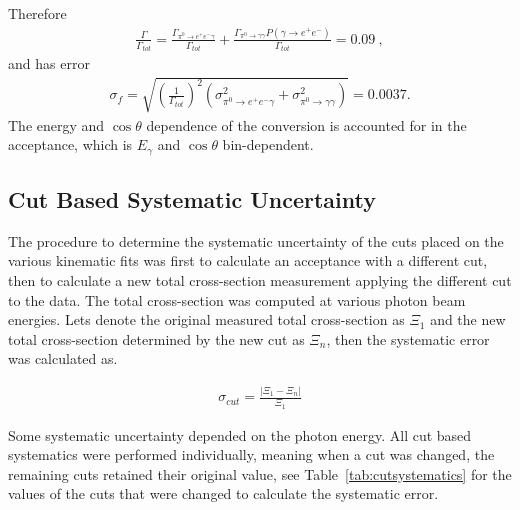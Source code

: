  	Therefore
 	\begin{align}
 		\frac{\Gamma}{\Gamma_{tot}} = \frac{\Gamma_{\pi^{0}\rightarrow e^{+}e^{-}\gamma}}{\Gamma_{tot}} + \frac{\Gamma_{\pi^{0}\rightarrow \gamma \gamma}P(\gamma \to  e^{+}e^{-})}{\Gamma_{tot}} = 0.09 \ ,
 	\end{align}
 	and has error
 	\begin{align}
 		\sigma_f = \sqrt{\left(\frac{1}{\Gamma_{tot}}\right)^2(\sigma^2_{\pi^{0}\rightarrow e^{+}e^{-}\gamma} + \sigma^2_{\pi^{0}\rightarrow \gamma \gamma})  } = 0.0037.  
 	\end{align}
 	The energy and $\cos \theta$ dependence of the conversion is accounted for in the acceptance, which is $E_\gamma$ and $\cos \theta$ bin-dependent. 
 	
 	
 	
 	\subsection{Cut Based Systematic Uncertainty}
 	The procedure to determine the systematic uncertainty of the cuts placed on the various kinematic fits was first to calculate an acceptance with a different cut, then to calculate a new total cross-section measurement applying the different cut to the data. The total cross-section was computed at various photon beam energies. Lets denote the original measured total cross-section as $\Xi_1$ and the new total cross-section determined by the new cut as $\Xi_n$, then the systematic error was calculated as.
 	
 	\begin{align}
 		\sigma_{cut} = \frac{\left| \Xi_1 - \Xi_n \right|}{\Xi_1}
 	\end{align}
 	
 	Some systematic uncertainty depended on the photon energy. All cut based systematics were performed individually, meaning when a cut was changed, the remaining cuts retained their original value, see Table~\ref{tab:cutsystematics} for the values of the cuts that were changed to calculate the systematic error.
 	
% 	
%
